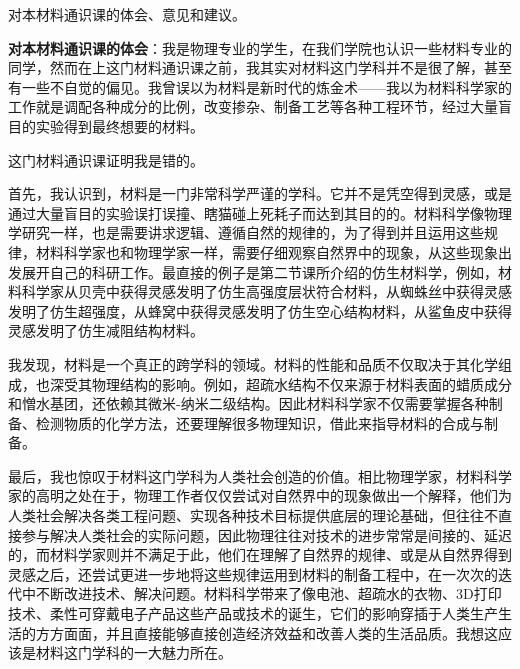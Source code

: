 \documentclass{assignment}
\begin{document}
\begin{ti}
    对本材料通识课的体会、意见和建议。
\end{ti}
\begin{da}
    \textbf{对本材料通识课的体会}：我是物理专业的学生，在我们学院也认识一些材料专业的同学，然而在上这门材料通识课之前，我其实对材料这门学科并不是很了解，甚至有一些不自觉的偏见。我曾误以为材料是新时代的炼金术——我以为材料科学家的工作就是调配各种成分的比例，改变掺杂、制备工艺等各种工程环节，经过大量盲目的实验得到最终想要的材料。

    这门材料通识课证明我是错的。

    首先，我认识到，材料是一门非常科学严谨的学科。它并不是凭空得到灵感，或是通过大量盲目的实验误打误撞、瞎猫碰上死耗子而达到其目的的。材料科学像物理学研究一样，也是需要讲求逻辑、遵循自然的规律的，为了得到并且运用这些规律，材料科学家也和物理学家一样，需要仔细观察自然界中的现象，从这些现象出发展开自己的科研工作。最直接的例子是第二节课所介绍的仿生材料学，例如，材料科学家从贝壳中获得灵感发明了仿生高强度层状符合材料，从蜘蛛丝中获得灵感发明了仿生超强度，从蜂窝中获得灵感发明了仿生空心结构材料，从鲨鱼皮中获得灵感发明了仿生减阻结构材料。

    我发现，材料是一个真正的跨学科的领域。材料的性能和品质不仅取决于其化学组成，也深受其物理结构的影响。例如，超疏水结构不仅来源于材料表面的蜡质成分和憎水基团，还依赖其微米-纳米二级结构。因此材料科学家不仅需要掌握各种制备、检测物质的化学方法，还要理解很多物理知识，借此来指导材料的合成与制备。

    最后，我也惊叹于材料这门学科为人类社会创造的价值。相比物理学家，材料科学家的高明之处在于，物理工作者仅仅尝试对自然界中的现象做出一个解释，他们为人类社会解决各类工程问题、实现各种技术目标提供底层的理论基础，但往往不直接参与解决人类社会的实际问题，因此物理往往对技术的进步常常是间接的、延迟的，而材料学家则并不满足于此，他们在理解了自然界的规律、或是从自然界得到灵感之后，还尝试更进一步地将这些规律运用到材料的制备工程中，在一次次的迭代中不断改进技术、解决问题。材料科学带来了像电池、超疏水的衣物、3D打印技术、柔性可穿戴电子产品这些产品或技术的诞生，它们的影响穿插于人类生产生活的方方面面，并且直接能够直接创造经济效益和改善人类的生活品质。我想这应该是材料这门学科的一大魅力所在。


\end{da}
\end{document}
